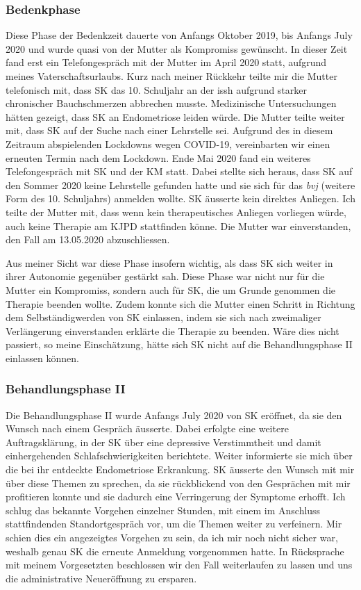 \subsubsection{Bedenkphase}
Diese Phase der Bedenkzeit dauerte von Anfangs Oktober 2019, bis Anfangs July 2020 und wurde quasi von der Mutter als Kompromiss gewünscht. In dieser Zeit fand erst ein Telefongespräch mit der Mutter im April 2020 statt, aufgrund meines Vaterschaftsurlaubs. Kurz nach meiner Rückkehr teilte mir die Mutter telefonisch mit, dass SK das 10. Schuljahr an der \ac{issh} aufgrund starker chronischer Bauchschmerzen abbrechen musste. Medizinische Untersuchungen hätten gezeigt, dass SK an Endometriose leiden würde. Die Mutter teilte weiter mit, dass SK auf der Suche nach einer Lehrstelle sei. Aufgrund des in diesem Zeitraum abspielenden Lockdowns wegen COVID-19, vereinbarten wir einen erneuten Termin nach dem Lockdown. Ende Mai 2020 fand ein weiteres Telefongespräch mit SK und der KM statt. Dabei stellte sich heraus, dass SK auf den Sommer 2020 keine Lehrstelle gefunden hatte und sie sich für das \textit{\ac{bvj}} (weitere Form des 10. Schuljahrs) anmelden wollte. SK äusserte kein direktes Anliegen. Ich teilte der Mutter mit, dass wenn kein therapeutisches Anliegen vorliegen würde, auch keine Therapie am KJPD stattfinden könne. Die Mutter war einverstanden, den Fall am 13.05.2020 abzuschliessen.

Aus meiner Sicht war diese Phase insofern wichtig, als dass SK sich weiter in ihrer Autonomie gegenüber gestärkt sah. Diese Phase war nicht nur für die Mutter ein Kompromiss, sondern auch für SK, die um Grunde genommen die Therapie beenden wollte. Zudem konnte sich die Mutter einen Schritt in Richtung dem Selbständigwerden von SK einlassen, indem sie sich nach zweimaliger Verlängerung einverstanden erklärte die Therapie zu beenden. Wäre dies nicht passiert, so meine Einschätzung, hätte sich SK nicht auf die Behandlungsphase II einlassen können. 

\subsubsection{Behandlungsphase II}
Die Behandlungsphase II wurde Anfangs July 2020 von SK eröffnet, da sie den Wunsch nach einem Gespräch äusserte. Dabei erfolgte eine weitere Auftragsklärung, in der SK über eine depressive Verstimmtheit und damit einhergehenden Schlafschwierigkeiten berichtete. Weiter informierte sie mich über die bei ihr entdeckte Endometriose Erkrankung. SK äusserte den Wunsch mit mir über diese Themen zu sprechen, da sie rückblickend von den Gesprächen mit mir profitieren konnte und sie dadurch eine Verringerung der Symptome erhofft. Ich schlug das bekannte Vorgehen einzelner Stunden, mit einem im Anschluss stattfindenden Standortgespräch vor, um die Themen weiter zu verfeinern. Mir schien dies ein angezeigtes Vorgehen zu sein, da ich mir noch nicht sicher war, weshalb genau SK die erneute Anmeldung vorgenommen hatte. In Rücksprache mit meinem Vorgesetzten beschlossen wir den Fall weiterlaufen zu lassen und uns die administrative Neueröffnung zu ersparen.

